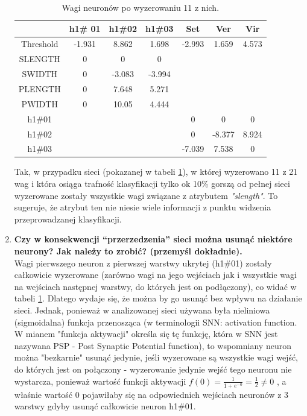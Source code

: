\begin{enumerate}
\begin{table}[ch]
	\centering
	\caption{Wagi neuronów po wyzerowaniu 11 z nich.\label{tab:zeroweights}}
	\begin{tabular}{|c|c|c|c|c|c|c|}
		\hline  & h1\# 01 & h1\#02 & h1\#03 & Set & Ver & Vir \\
		\hline Threshold & -1.931 & 8.862 & 1.698 & -2.993 & 1.659 & 4.573 \\
		\hline SLENGTH & 0 & 0 & 0 &  &  & \\
		\hline SWIDTH & 0 & -3.083 & -3.994 &  &  &  \\
		\hline PLENGTH & 0 & 7.648 & 5.271 &  &  &  \\
		\hline PWIDTH & 0 & 10.05 & 4.444 &  &  &  \\
		\hline h1\#01 &  &  &  & 0 & 0 & 0\\
		\hline h1\#02 &  &  &  & 0 & -8.377 & 8.924 \\
		\hline h1\#03 &  &  &  & -7.039 & 7.538 & 0 \\
		\hline
	\end{tabular}
\end{table}


Tak, w przypadku sieci (pokazanej w tabeli \ref{tab:zeroweights}), w której wyzerowano 11 z 21 wag i która osiąga trafność klasyfikacji tylko ok 10\% gorszą od pełnej sieci wyzerowane zostały wszystkie wagi związane z atrybutem \emph{"slength"}. To sugeruje, że atrybut ten nie niesie wiele informacji z punktu widzenia przeprowadzanej klasyfikacji.

\item \textbf{
Czy w konsekwencji “przerzedzenia” sieci można usunąć niektóre neurony? Jak należy to zrobić?
 (przemyśl dokładnie).}
 \\Wagi pierwszego neuron z pierwszej warstwy ukrytej (h1\#01) zostały całkowicie wyzerowane (zarówno wagi na jego wejściach jak i wszystkie wagi na wejściach następnej warstwy, do których jest on podłączony), co widać w tabeli \ref{tab:zeroweights}. Dlatego wydaje się, że można by go usunąć bez wpływu na działanie sieci. Jednak, ponieważ w analizowanej sieci używana była nieliniowa (sigmoidalna) funkcja przenosząca (w terminologii SNN: activation function. W \cite{umisn} mianem "funkcja aktywacji" określa się tę funkcję, która w SNN jest nazywana PSP - Post Synaptic Potential function), to wspomniany neuron można "bezkarnie" usunąć jedynie, jeśli wyzerowane są wszystkie wagi wejść, do których jest on połączony - wyzerowanie jedynie wejść tego neuronu nie wystarcza, ponieważ wartość funkcji aktywacji $ f(0) = \frac{1}{1 + e^{-0}} = \frac{1}{2} \neq 0 $ , a właśnie wartość 0 pojawiłaby się na odpowiednich wejściach neuronów z 3 warstwy gdyby usunąć całkowicie neuron h1\#01.
\end{enumerate}

